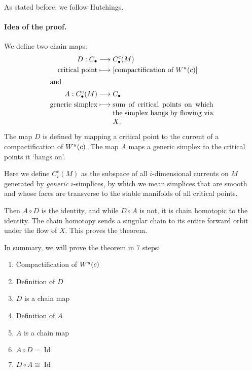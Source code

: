 \begin{myproof}
    As stated before, we follow Hutchings.
    \paragraph{Idea of the proof.}
    
    We define two chain maps:
    \begin{align*}
        D: C_\bul &\longrightarrow C_\bul^{\text{c}}(M) \\
         \text{critical point}&\longmapsto [\text{compactification of $\unstable{c}$}]\\
         \shortintertext{and}
        A: C_\bul^{\text{c}}(M) &\longrightarrow C_\bul \\
         \text{generic simplex} &\longmapsto 
         \parbox[t][][t]{5cm}{sum of critical points on which the simplex hangs by flowing via $X$.}
    \end{align*}
\begin{marginfigure}
    \centering
    \caption{The map $D$ is defined by mapping a critical point to the current of a compactification of $W^u(c)$. The map $A$ maps a generic simplex to the critical points it `hangs on'.}
    \label{fig:idea-of-the-proof-maps-a-and-d}
\end{marginfigure}

    Here we define $C_i^{\text{c}}(M)$ as the subspace of all  $i$-dimensional currents on $M$ generated by \emph{generic} $i$-simplices, by which we mean simplices that are smooth and whose faces are transverse to the stable manifolds of all critical points.


    Then $A  \circ D$ is the identity, and while $D  \circ  A$ is not, it is chain homotopic to the identity.
    The chain homotopy sends a singular chain to its entire forward orbit under the flow of $X$.
    This proves the theorem.

    In summary, we will prove the theorem in $7$ steps:
    \begin{enumerate}
        \item Compactification of $W^u(c)$
        \item Definition of $D$
        \item $D$ is a chain map
        \item Definition of $A$
        \item $A$ is a chain map
        \item $A  \circ D = \operatorname{Id}$
        \item  $D  \circ A \cong \operatorname{Id}$
    \end{enumerate}


\end{myproof}
